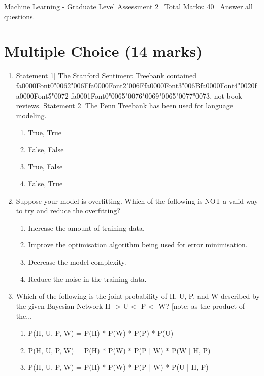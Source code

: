 \documentclass[12pt]{article}
\begin{document}
\begin{center}
Machine Learning - Graduate Level Assessment 2 \
Total Marks: 40 \
Answer all questions.
\end{center}

\section*{Multiple Choice (14 marks)}
\begin{enumerate}[label=\arabic*.]
\item Statement 1| The Stanford Sentiment Treebank contained {\csname fa0000Font0\endcsname\char"0062}{\char"006F}{\csname fa0000Font2\endcsname\char"006F}{\csname fa0000Font3\endcsname\char"006B}{\csname fa0000Font4\endcsname\char"0020}{\csname fa0000Font5\endcsname\char"0072} {\csname fa0001Font0\endcsname\char"0065}{\char"0076}{\char"0069}{\char"0065}{\char"0077}{\char"0073}, not book reviews. Statement 2| The Penn Treebank has been used for language modeling.
\begin{enumerate}[label=(\alph*)]
    \item True, True
    \item False, False
    \item True, False
    \item False, True
\end{enumerate}
\item Suppose your model is overfitting. Which of the following is NOT a valid way to try and reduce the overfitting?
\begin{enumerate}[label=(\alph*)]
    \item Increase the amount of training data.
    \item Improve the optimisation algorithm being used for error minimisation.
    \item Decrease the model complexity.
    \item Reduce the noise in the training data.
\end{enumerate}
\item Which of the following is the joint probability of H, U, P, and W described by the given Bayesian Network H -> U <- P <- W? [note: as the product of the...
\begin{enumerate}[label=(\alph*)]
    \item P(H, U, P, W) = P(H) * P(W) * P(P) * P(U)
    \item P(H, U, P, W) = P(H) * P(W) * P(P | W) * P(W | H, P)
    \item P(H, U, P, W) = P(H) * P(W) * P(P | W) * P(U | H, P)

\end{enumerate}
\end{enumerate}
\end{document}
